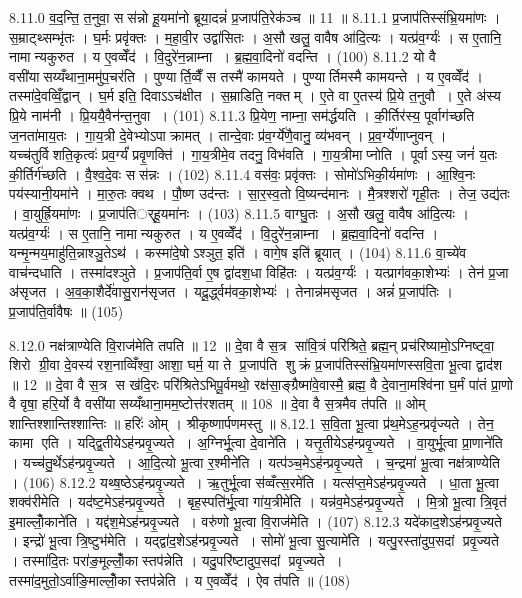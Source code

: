 8.11.0
व॒द॒न्ति॒ त॒नुवा॒ सस॑न्नो हू॒यमा॑नो ब्रूया॒दन्नं॑ प्र॒जाप॑ति॒रेक॑ञ्च ॥ 11 ॥
8.11.1
प्र॒जाप॑तिस्संभ्रि॒यमा॑णः । स॒म्राट्थ्सम्भृ॑तः । घ॒र्मः प्रवृ॑क्तः । म॒हा॒वी॒र उद्वा॑सितः । अ॒सौ खलु॒ वावैष आ॑दि॒त्यः । यत्प्र॑व॒र्ग्यः॑ । स ए॒तानि॒ नामान्यकुरुत । य ए॒वव्वेँद॑ । वि॒दुरे॑न॒न्नाम्ना । ब्र॒ह्म॒वा॒दिनो॑ वदन्ति । (100)
8.11.2
यो वै वसी॑यासय्यँथाना॒ममु॑प॒चर॑ति । पुण्यार्ति॒व्वैँ स तस्मै॑ कामयते । पुण्यार्तिमस्मै कामयन्ते । य ए॒वव्वेँद॑ । तस्मा॑दे॒वव्विँ॒द्वान् । घ॒र्म इति॒ दिवाऽऽच॑क्षीत । स॒म्राडिति॒ नक्तम् । ए॒ते वा ए॒तस्य॑ प्रि॒ये त॒नुवौ । ए॒ते अ॑स्य प्रि॒ये नाम॑नी । प्रि॒ययै॒वैन॑न्त॒नुवा । (101)
8.11.3
प्रि॒येण॒ नाम्ना॒ सम॑र्द्धयति । की॒र्तिर॑स्य॒ पूर्वाग॑च्छति ज॒नता॑माय॒तः । गा॒य॒त्री दे॒वेभ्योऽपाक्रामत् । तान्दे॒वाः प्र॑व॒र्ग्ये॑णै॒वानु॒ व्य॑भवन् । प्र॒व॒र्ग्ये॑णाप्नुवन् । यच्च॑तुर्विशति॒कृत्वः॑ प्रव॒र्ग्यं॑ प्रवृ॒णक्ति॑ । गा॒य॒त्रीमे॒व तदनु॒ विभ॑वति । गा॒य॒त्रीमाप्नोति । पूर्वाऽस्य॒ जनं॑ य॒तः की॒र्तिर्ग॑च्छति । वै॒श्व॒दे॒वः सस॑न्नः । (102)
8.11.4
वस॑वः॒ प्रवृ॑क्तः । सोमो॑ऽभिकी॒र्यमा॑णः । आ॒श्वि॒नः पय॑स्यानी॒यमा॑ने । मा॒रु॒तः क्वथ\sn{} । पौ॒ष्ण उद॑न्तः । सा॒र॒स्व॒तो वि॒ष्यन्द॑मानः । मै॒त्रश्शरो॑ गृही॒तः । तेज॒ उद्य॑तः । वा॒युर्ह्रि॒यमा॑णः । प्र॒जाप॑तिर््हू॒यमा॑नः । (103)
8.11.5
वाग्घु॒तः । अ॒सौ खलु॒ वावैष आ॑दि॒त्यः । यत्प्र॑व॒र्ग्यः॑ । स ए॒तानि॒ नामान्यकुरुत । य ए॒वव्वेँद॑ । वि॒दुरे॑न॒न्नाम्ना । ब्र॒ह्म॒वा॒दिनो॑ वदन्ति । यन्मृ॒न्मय॒माहु॑ति॒न्नाश्ञु॒तेऽथ॑ । कस्मा॑दे॒षोऽश्ञुत॒ इति॑ । वागे॒ष इति॑ ब्रूयात् । (104)
8.11.6
वा॒च्ये॑व वाच॑न्दधाति । तस्मा॑दश्ञुते । प्र॒जाप॑ति॒र्वा ए॒ष द्वा॑दश॒धा विहि॑तः । यत्प्र॑व॒र्ग्यः॑ । यत्प्राग॑वका॒शेभ्यः॑ । तेन॑ प्र॒जा अ॑सृजत । अ॒व॒का॒शैर्दे॑वासु॒रान॑सृजत । यदू॒र्द्ध्वम॑वका॒शेभ्यः॑ । तेनान्न॑मसृजत । अन्नं॑ प्र॒जाप॑तिः । प्र॒जाप॑ति॒र्वावैषः ॥ (105)
\anuvakamend

8.12.0
नक्ष॑त्राण्येति वि॒राज॑मेति तपति ॥ 12 ॥ दे॒वा वै स॒त्र सा॑वि॒त्रं परि॑श्रिते॒ ब्रह्म॒न् प्रच॑रिष्यामो॒ऽग्निष्ट्वा॒ शिरो ग्री॒वा दे॒वस्य॑ रश॒नाव्विँश्वा॒ आशा॒ घर्म॒ या ते प्र॒जाप॑ति शुक्रं प्र॒जाप॑तिस्संभ्रि॒यमा॑णस्सवि॒ता भू॒त्वा द्वाद॑श ॥ 12 ॥ दे॒वा वै स॒त्र स ख॑दि॒रः परि॑श्रितेऽभिपू॒र्वमथो॒ रक्ष॑सा॒ङ्ग्रैष्मा॑वे॒वास्मै॒ ब्रह्म॒ वै दे॒वाना॒मश्वि॑ना घ॒र्मं पा॑तं प्रा॒णो वै वृषा॒ हरि॒र्यो वै वसी॑यासय्यँथाना॒मम॒ष्टोत्त॑रशतम् ॥ 108 ॥ दे॒वा वै स॒त्रमैव त॑पति ॥ ओम् शान्तिश्शान्तिश्शान्तिः ॥ हरिः॑ ओम् । श्रीकृष्णार्पणमस्तु ॥
8.12.1
स॒वि॒ता भू॒त्वा प्र॑थ॒मेऽह॒न्प्रवृ॑ज्यते । तेन॒ कामा एति । यद्द्वि॒तीयेऽह॑न्प्रवृ॒ज्यते । अ॒ग्निर्भू॒त्वा दे॒वाने॑ति । यत्तृ॒तीयेऽह॑न्प्रवृ॒ज्यते । वा॒युर्भू॒त्वा प्रा॒णाने॑ति । यच्च॑तु॒र्थेऽह॑न्प्रवृ॒ज्यते । आ॒दि॒त्यो भू॒त्वा र॒श्मीने॑ति । यत्प॑ञ्च॒मेऽह॑न्प्रवृ॒ज्यते । च॒न्द्रमा॑ भू॒त्वा नक्ष॑त्राण्येति । (106)
8.12.2
यथ्ष॒ष्ठेऽह॑न्प्रवृ॒ज्यते । ऋ॒तुर्भू॒त्वा स॑व्वँत्स॒रमे॑ति । यत्स॑प्त॒मेऽह॑न्प्रवृ॒ज्यते । धा॒ता भू॒त्वा शक्व॑रीमेति । यद॑ष्ट॒मेऽह॑न्प्रवृ॒ज्यते । बृह॒स्पति॑र्भू॒त्वा गा॑य॒त्रीमे॑ति । यन्न॑व॒मेऽह॑न्प्रवृ॒ज्यते । मि॒त्रो भू॒त्वा त्रि॒वृत॑ इ॒माल्लोँ॒काने॑ति । यद्द॑श॒मेऽह॑न्प्रवृ॒ज्यते । वरु॑णो भू॒त्वा वि॒राज॑मेति । (107)
8.12.3
यदे॑काद॒शेऽह॑न्प्रवृ॒ज्यते । इन्द्रो॑ भू॒त्वा त्रि॒ष्टुभ॑मेति । यद्द्वा॑द॒शेऽह॑न्प्रवृ॒ज्यते । सोमो॑ भू॒त्वा सु॒त्यामे॑ति । यत्पु॒रस्ता॑दुप॒सदां प्रवृ॒ज्यते । तस्मा॑दि॒तः परा॑ङ॒मूल्लोँ॒कास्तप॑न्नेति । यदु॒परि॑ष्टादुप॒सदां प्रवृ॒ज्यते । तस्मा॑द॒मुतो॒ऽर्वाङि॒माल्लोँ॒कास्तप॑न्नेति । य ए॒वव्वेँद॑ । ऐव त॑पति ॥ (108)

